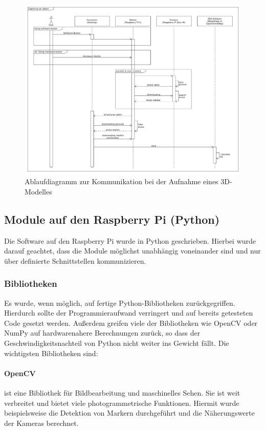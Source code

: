 \documentclass[./00PhotoBox.tex]{subfiles}
\begin{document}
\begin{figure}
    \centering
    \includegraphics[width=1\textwidth]{./img/uml/uml_sequence_capture.pdf}
    \caption{Ablaufdiagramm zur Kommunikation bei der Aufnahme eines 3D-Modelles} %
    \label{img:uml_sequence_capture} %
\end{figure}


\subsection{Module auf den Raspberry Pi (Python)}
Die Software auf den Raspberry Pi wurde in Python geschrieben. Hierbei wurde darauf geachtet, dass die Module möglichst unabhängig voneinander sind und nur über definierte Schnittstellen kommunizieren.

\subsubsection{Bibliotheken}
Es wurde, wenn möglich, auf fertige Python-Bibliotheken zurückgegriffen. Hierdurch sollte der Programmieraufwand verringert und auf bereits getesteten Code gesetzt werden. Außerdem greifen viele der Bibliotheken wie OpenCV oder NumPy auf hardwarenahere Berechnungen zurück, so dass der Geschwindigkeitsnachteil von Python nicht weiter ins Gewicht fällt. Die wichtigsten Bibliotheken sind:

\paragraph{OpenCV}
ist eine Bibliothek für Bildbearbeitung und maschinelles Sehen. Sie ist weit verbreitet und bietet viele photogrammetrische Funktionen. Hiermit wurde beispielsweise die Detektion von Markern durchgeführt und die Näherungswerte der Kameras berechnet.
\end{document}
